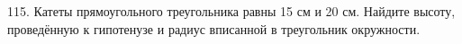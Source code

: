 115. Катеты прямоугольного треугольника равны 15 см и 20 см. Найдите высоту, проведённую к гипотенузе и радиус вписанной в треугольник окружности.\\
